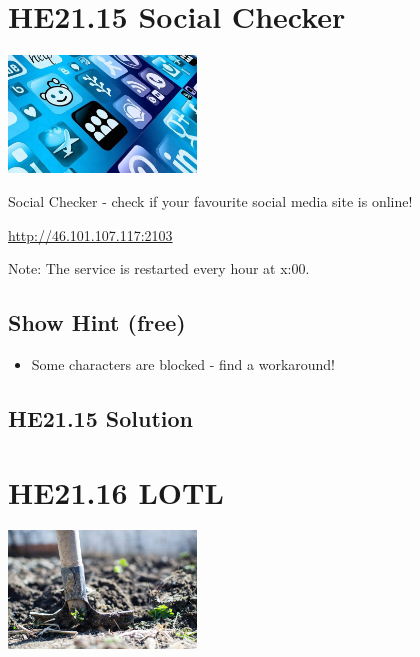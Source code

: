 \documentclass[english,a4paper,nols,noindent]{tufte-handout}
\begin{document}
\hypertarget{he21.15}{%
  \section{HE21.15 Social Checker}
  \label{he21.15}}
\begin{marginfigure}
    \includegraphics[width=50mm]{images/challenge15.jpg}
\end{marginfigure}

\noindent Social Checker - check if your favourite social media site is online!

\url{http://46.101.107.117:2103}

Note: The service is restarted every hour at x:00.

\subsection{Show Hint (free)}
\begin{itemize}
\item Some characters are blocked - find a workaround!
\end{itemize}


\hypertarget{he21.15-solution}{%
\subsection{HE21.15 Solution}\label{he21.15-solution}}

\noindent 

\hypertarget{he21.16}{%
  \section{HE21.16 LOTL}
  \label{he21.16}}
\begin{marginfigure}
    \includegraphics[width=50mm]{images/challenge16.jpg}
\end{marginfigure}
\end{document}
